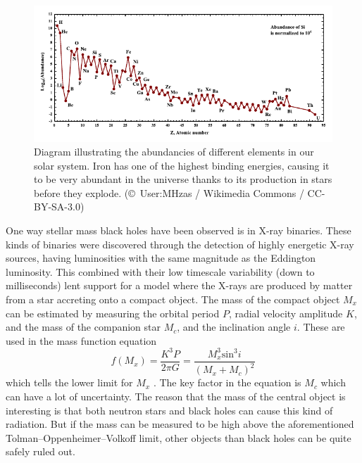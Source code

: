 \documentclass[english, oneside]{HYgradu}
\begin{document}
\begin{figure}[h!tb]
\centering
\includegraphics[width=\textwidth]{../images/SolarSystemAbundances.pdf}
\caption{Diagram illustrating the abundancies of different elements in our solar system. Iron has one of the highest binding energies, causing it to be very abundant in the universe thanks to its production in stars before they explode.
(\copyright \ User:MHz\textasciigrave as / Wikimedia Commons / CC-BY-SA-3.0)}
\label{fig:IronPeak}
\end{figure}

One way stellar mass black holes have been observed is in X-ray binaries. These kinds of binaries were discovered through the detection of highly energetic X-ray sources, having luminosities with the same magnitude as the Eddington luminosity. This combined with their low timescale variability (down to milliseconds) lent support for a model where the X-rays are produced by matter from a star accreting onto a compact object. The mass of the compact object $M_x$ can be estimated by measuring the orbital period $P$, radial velocity amplitude $K$, and the mass of the companion star $M_c$, and the inclination angle $i$. These are used in the mass function equation 
\begin{equation}
f(M_x) = \frac{K^3 P}{2 \pi G} = \frac{M_x^3 \mathrm{sin}^3 i}{(M_x + M_c)^2}
\end{equation}
which tells the lower limit for $M_x$ \citep{casares:2007}. The key factor in the equation is $M_c$ which can have a lot of uncertainty. The reason that the mass of the central object is interesting is that both neutron stars and black holes can cause this kind of radiation. But if the mass can be measured to be high above the aforementioned Tolman–Oppenheimer–Volkoff limit, other objects than black holes can be quite safely ruled out.

\end{document}
